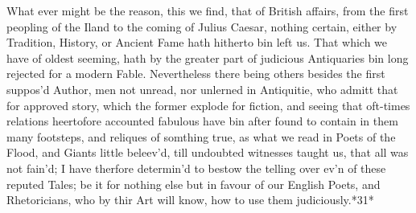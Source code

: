 What ever might be the reason, this we find, that of British affairs, from the first peopling of the Iland to the coming of Julius Caesar, nothing certain, either by Tradition, History, or Ancient Fame hath hitherto bin left us. That which we have of oldest seeming, hath by the greater part of judicious Antiquaries bin long rejected for a modern Fable. Nevertheless there being others besides the first suppos'd Author, men not unread, nor unlerned in Antiquitie, who admitt that for approved story, which the former explode for fiction, and seeing that oft-times relations heertofore accounted fabulous have bin after found to contain in them many footsteps, and reliques of somthing true, as what we read in Poets of the Flood, and Giants little beleev'd, till undoubted witnesses taught us, that all was not fain'd; I have therfore determin'd to bestow the telling over ev'n of these reputed Tales; be it for nothing else but in favour of our English Poets, and Rhetoricians, who by thir Art will know, how to use them judiciously.*31*
